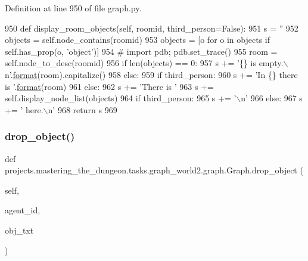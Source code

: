 Definition at line 950 of file graph.\+py.


\begin{DoxyCode}
950     \textcolor{keyword}{def }display\_room\_objects(self, roomid, third\_person=False):
951         s = \textcolor{stringliteral}{''}
952         objects = self.node\_contains(roomid)
953         objects = [o \textcolor{keywordflow}{for} o \textcolor{keywordflow}{in} objects \textcolor{keywordflow}{if} self.has\_prop(o, \textcolor{stringliteral}{'object'})]
954         \textcolor{comment}{# import pdb; pdb.set\_trace()}
955         room = self.node\_to\_desc(roomid)
956         \textcolor{keywordflow}{if} len(objects) == 0:
957             s += \textcolor{stringliteral}{'\{\} is empty.\(\backslash\)n'}.\hyperlink{namespaceparlai_1_1chat__service_1_1services_1_1messenger_1_1shared__utils_a32e2e2022b824fbaf80c747160b52a76}{format}(room).capitalize()
958         \textcolor{keywordflow}{else}:
959             \textcolor{keywordflow}{if} third\_person:
960                 s += \textcolor{stringliteral}{'In \{\} there is '}.\hyperlink{namespaceparlai_1_1chat__service_1_1services_1_1messenger_1_1shared__utils_a32e2e2022b824fbaf80c747160b52a76}{format}(room)
961             \textcolor{keywordflow}{else}:
962                 s += \textcolor{stringliteral}{'There is '}
963             s += self.display\_node\_list(objects)
964             \textcolor{keywordflow}{if} third\_person:
965                 s += \textcolor{stringliteral}{'\(\backslash\)n'}
966             \textcolor{keywordflow}{else}:
967                 s += \textcolor{stringliteral}{' here.\(\backslash\)n'}
968         \textcolor{keywordflow}{return} s
969 
\end{DoxyCode}
\mbox{\label{classprojects_1_1mastering__the__dungeon_1_1tasks_1_1graph__world2_1_1graph_1_1Graph_ac41cef28bdac9c94bb8622e9f19506e5}} 
\subsubsection{\texorpdfstring{drop\+\_\+object()}{drop\_object()}}
{\footnotesize\ttfamily def projects.\+mastering\+\_\+the\+\_\+dungeon.\+tasks.\+graph\+\_\+world2.\+graph.\+Graph.\+drop\+\_\+object (\begin{DoxyParamCaption}\item[{}]{self,  }\item[{}]{agent\+\_\+id,  }\item[{}]{obj\+\_\+txt }\end{DoxyParamCaption})}



